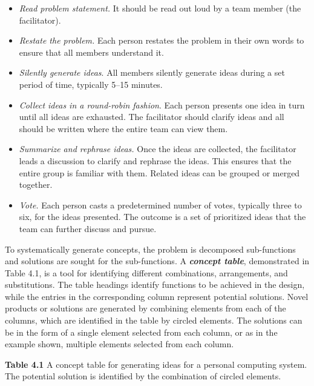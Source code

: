\begin{itemize}
\item
  \emph{Read problem statement.} It should be read out loud by a team
  member (the facilitator).
\item
  \emph{Restate the problem.} Each person restates the problem in their
  own words to ensure that all members understand it.
\item
  \emph{Silently generate ideas}. All members silently generate ideas
  during a set period of time, typically 5--15 minutes.
\item
  \emph{Collect ideas in a round-robin fashion}. Each person presents
  one idea in turn until all ideas are exhausted. The facilitator should
  clarify ideas and all should be written where the entire team can view
  them.
\item
  \emph{Summarize and rephrase ideas.} Once the ideas are collected, the
  facilitator leads a discus­sion to clarify and rephrase the ideas. This
  ensures that the entire group is familiar with them. Related ideas can
  be grouped or merged together.
\item
  \emph{Vote.} Each person casts a predetermined number of votes,
  typically three to six, for the ideas presented. The outcome is a set
  of prioritized ideas that the team can further discuss and pursue.
\end{itemize}

To systematically generate concepts, the problem is decomposed
sub-functions and solutions are sought for the sub-functions. A
\emph{\textbf{concept table}}, demonstrated in Table 4.1, is a tool for
identifying different combinations, arrangements, and substitutions. The
table headings identify functions to be achieved in the design, while
the entries in the corresponding column represent po­tential solutions.
Novel products or solutions are generated by combining elements from
each of the columns, which are identified in the table by circled
elements. The solutions can be in the form of a single element selected
from each column, or as in the example shown, multiple elements selected
from each column.

\textbf{Table 4.1} A concept table for generating ideas for a personal
computing system. The potential so­lution is identified by the
combination of circled elements.

